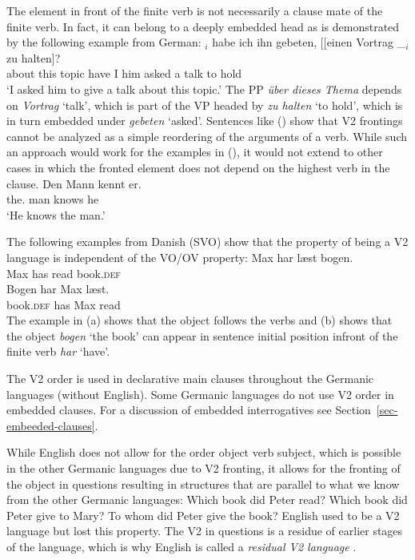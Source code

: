 The element in front of the finite verb is not necessarily a clause mate of the finite verb. In
fact, it can belong to a deeply embedded head as is demonstrated by the following example from
German:
\ea
{}$_i$ habe ich ihn gebeten, [[einen Vortrag \_$_i$ zu halten]?\footnotemark\\
     \spacebr{}about this topic  have I him asked \hspaceThis{[[}a talk {} to hold\\\german
{}
\glt `I asked him to give a talk about this topic.'
\z
The PP \emph{über dieses Thema} depends on \emph{Vortrag} `talk', which is part of the VP headed by
\emph{zu halten} `to hold', which is in turn embedded under \emph{gebeten} `asked'. Sentences like
() show that V2 frontings cannot be analyzed as a simple reordering of the arguments of a
verb. While such an approach would work for the examples in (), it would not extend to other
cases in which the fronted element does not depend on the highest verb in the clause.
\ea
\gll Den Mann kennt er.\\
     the.\ACC{} man knows he\\
\glt `He knows the man.'
\z

The following examples from Danish (SVO) show that the property of being a V2
language is independent of the VO/OV property:
\eal
\ex 
\gll Max har læst bogen.\\
     Max has read book.\textsc{def}\\\danish
\ex
\gll Bogen har Max læst.\\
     book.\textsc{def} has Max read\\
\zl
The example in (a) shows that the object follows the verbs and (b) shows that the
object \emph{bogen} `the book' can appear in sentence initial position infront of the finite verb
\emph{har} `have'.

The V2 order is used in declarative main clauses throughout the Germanic languages (without
English). Some Germanic languages do not use V2 order in embedded clauses. For a discussion of
embedded interrogatives see Section~\ref{sec-embeeded-clauses}.

While English does not allow for the order object verb subject, which is possible in the other Germanic
languages due to V2 fronting, it allows for the fronting of the object in questions resulting in
structures that are parallel to what we know from the other Germanic languages:
\eal
\ex Which book did Peter read?
\ex Which book did Peter give to Mary?
\ex To whom did Peter give the book?
\zl
English used to be a V2 language but lost this property. The V2 in questions is a residue of earlier
stages of the language, which is why English is called a \emph{residual V2 language} \citep[]{Rizzi1990a-u}. 

